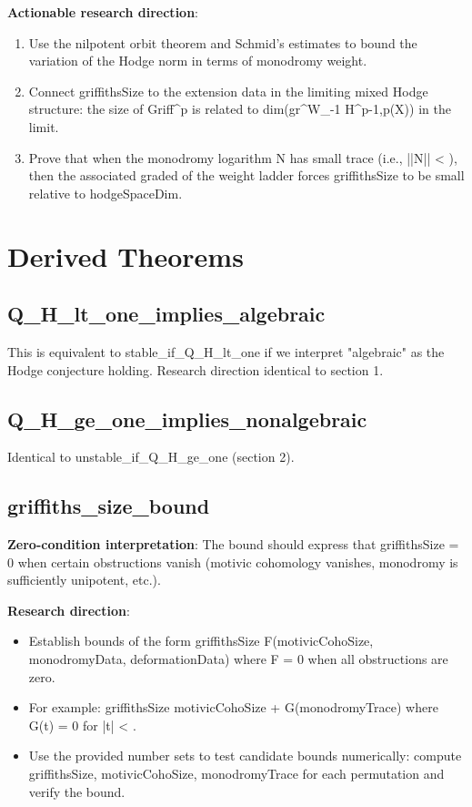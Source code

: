 \documentclass[11pt]{article}
\begin{document}
\textbf{Actionable research direction}:
\begin{enumerate}
\item Use the nilpotent orbit theorem and Schmid's estimates to bound the variation of the Hodge norm in terms of monodromy weight.
\item Connect griffithsSize to the extension data in the limiting mixed Hodge structure: the size of Griff^{p} is related to dim(gr^{W}_{-1} H^{p-1,p}(X)) in the limit.
\item Prove that when the monodromy logarithm N has small trace (i.e., ||N|| < \varepsilon), then the associated graded of the weight ladder forces griffithsSize to be small relative to hodgeSpaceDim.
\end{enumerate}

\section{Derived Theorems}

\subsection{Q\_H\_lt\_one\_implies\_algebraic}
This is equivalent to stable\_if\_Q\_H\_lt\_one if we interpret "algebraic" as the Hodge conjecture holding. Research direction identical to section 1.

\subsection{Q\_H\_ge\_one\_implies\_nonalgebraic}
Identical to unstable\_if\_Q\_H\_ge\_one (section 2).

\subsection{griffiths\_size\_bound}
\textbf{Zero-condition interpretation}: The bound should express that griffithsSize = 0 when certain obstructions vanish (motivic cohomology vanishes, monodromy is sufficiently unipotent, etc.).

\textbf{Research direction}:
\begin{itemize}
\item Establish bounds of the form griffithsSize \leq F(motivicCohoSize, monodromyData, deformationData) where F = 0 when all obstructions are zero.
\item For example: griffithsSize \leq motivicCohoSize + G(monodromyTrace) where G(t) = 0 for |t| < \varepsilon.
\item Use the provided number sets to test candidate bounds numerically: compute griffithsSize, motivicCohoSize, monodromyTrace for each permutation and verify the bound.
\end{itemize}
\end{document}
